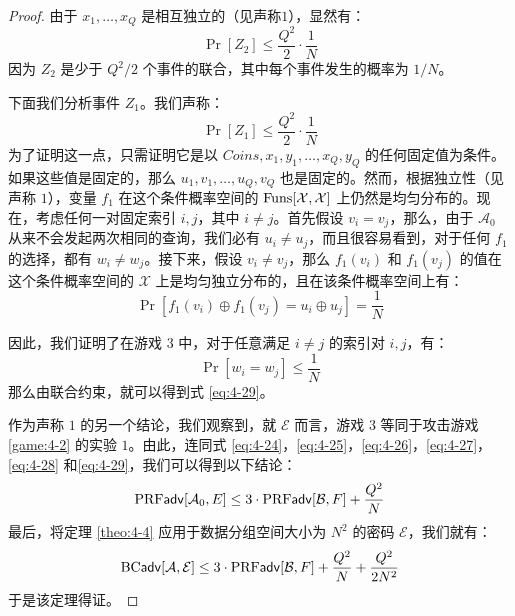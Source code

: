 \begin{proof}
由于 $x_1,\dots,x_Q$ 是相互独立的（见声称$1$），显然有：
\begin{equation}\label{eq:4-28}
\Pr[Z_2]\leq\frac{Q^2}{2}\cdot\frac{1}{N}
\end{equation}
因为 $Z_2$ 是少于 ${Q^2}/{2}$ 个事件的联合，其中每个事件发生的概率为 ${1}/{N}$。

下面我们分析事件 $Z_1$。我们声称：
\begin{equation}\label{eq:4-29}
\Pr[Z_1]\leq\frac{Q^2}{2}\cdot\frac{1}{N}
\end{equation}
为了证明这一点，只需证明它是以 $Coins,x_1,y_1,\dots,x_Q,y_Q$ 的任何固定值为条件。如果这些值是固定的，那么 $u_1,v_1,\dots,u_Q,v_Q$ 也是固定的。然而，根据独立性（见声称 $1$），变量 $f_1$ 在这个条件概率空间的 ${\rm Funs}[\mathcal{X},\mathcal{X}]$ 上仍然是均匀分布的。现在，考虑任何一对固定索引 $i,j$，其中 $i\neq j$。首先假设 $v_i=v_j$，那么，由于 $\mathcal{A}_0$ 从来不会发起两次相同的查询，我们必有 $u_i\neq u_j$，而且很容易看到，对于任何 $f_1$ 的选择，都有 $w_i\neq w_j$。接下来，假设 $v_i\neq v_j$，那么 $f_1(v_i)$ 和 $f_1(v_j)$ 的值在这个条件概率空间的 $\mathcal{X}$ 上是均匀独立分布的，且在该条件概率空间上有：
\[
\Pr[f_1(v_i)\oplus f_1(v_j)=u_i\oplus u_j]=\frac{1}{N}
\]

因此，我们证明了在游戏 $3$ 中，对于任意满足 $i\neq j$ 的索引对 $i,j$，有：
\[
\Pr[w_i=w_j]\leq\frac{1}{N}
\]
那么由联合约束，就可以得到式 \ref{eq:4-29}。

作为声称 $1$ 的另一个结论，我们观察到，就 $\mathcal{E}$ 而言，游戏 $3$ 等同于攻击游戏 \ref{game:4-2} 的实验 $1$。由此，连同式 \ref{eq:4-24}，\ref{eq:4-25}，\ref{eq:4-26}，\ref{eq:4-27}，\ref{eq:4-28} 和\ref{eq:4-29}，我们可以得到以下结论：
\[
{\rm PRF\mathsf{adv}}[\mathcal{A}_0,E]\leq3\cdot{\rm PRF\mathsf{adv}}[\mathcal{B},F]+\frac{Q^2}{N}
\]
最后，将定理 \ref{theo:4-4} 应用于数据分组空间大小为 $N^2$ 的密码 $\mathcal{E}$，我们就有：
\[
{\rm BC\mathsf{adv}}[\mathcal{A},\mathcal{E}]\leq3\cdot{\rm PRF\mathsf{adv}}[\mathcal{B},F]+\frac{Q^2}{N}+\frac{Q^2}{2N^2}
\]
于是该定理得证。
\end{proof}